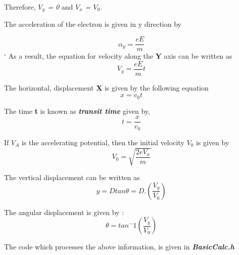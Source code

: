 \documentclass[a4paper,20pt,twoside]{report}
\begin{document}
	Therefore, \textit{$V_y$ = 0} and \textit{$V_x$ = $V_0$}.
	
	The  acceleration of the electron is given in y direction by 
	
	\begin{equation}
	\alpha_y = \frac{eE}{m}
	\end{equation}
	`
	As a result, the equation for velocity along the \textbf{Y} axis can be written as
	\begin{equation}
	V_y = \frac{eE}{m}t
	\end{equation}
	
	The horizontal, displacement \textbf{X} is given by the following equation
	\begin{equation}
		x = v_0t
	\end{equation}
	
	The time \textbf{t} is known as \textit{\textbf{transit time}} given by,
	\begin{equation}
	t = \frac{x}{v_0}
	\end{equation}
	
	If \textbf{$V_A$} is the accelerating potential, then the initial velocity $V_0$ is given by
	\begin{equation}
	V_0 = \sqrt{\frac{2eV_a}{m}}
	\end{equation}
	
	The vertical displacement can be written as 
	\begin{equation}
	y = Dtan\theta = D.\left({\frac{V_y}{V_0}}\right)
	\end{equation}
	
	The angular displacement is given by : 
	\begin{equation}
	\theta = tan^-1\left(\frac{V_y}{V_0}\right)
	\end{equation}
	
	
	The code which processes the above information, is given in \textit{\textbf{BasicCalc.h}}
	
\end{document}
